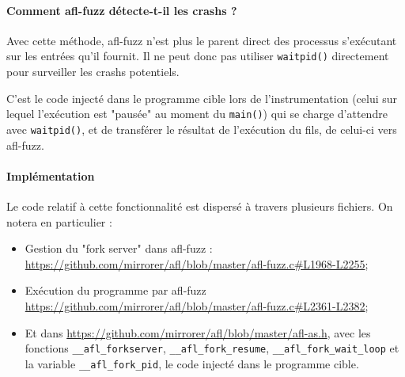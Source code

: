 
\paragraph{Comment afl-fuzz détecte-t-il les crashs ?}

Avec cette méthode, afl-fuzz n'est plus le parent direct des processus s'exécutant sur les entrées qu'il fournit.
Il ne peut donc pas utiliser \lstinline{waitpid()} directement pour surveiller les crashs potentiels.

C'est le code injecté dans le programme cible lors de l'instrumentation (celui sur lequel l'exécution est "pausée" au moment du \lstinline{main()}) qui se charge d'attendre avec \lstinline{waitpid()}, et de transférer le résultat de l'exécution du fils, de celui-ci vers afl-fuzz.

\paragraph{Implémentation}

Le code relatif à cette fonctionnalité est dispersé à travers plusieurs fichiers.
On notera en particulier :
\begin{itemize}
  \item{} Gestion du "fork server" dans afl-fuzz : \url{https://github.com/mirrorer/afl/blob/master/afl-fuzz.c#L1968-L2255};
  \item{} Exécution du programme par afl-fuzz \url{https://github.com/mirrorer/afl/blob/master/afl-fuzz.c#L2361-L2382};
  \item{} Et dans \url{https://github.com/mirrorer/afl/blob/master/afl-as.h}, avec les fonctions \lstinline{__afl_forkserver}, \lstinline{__afl_fork_resume}, \lstinline{__afl_fork_wait_loop} et la variable \lstinline{__afl_fork_pid}, le code injecté dans le programme cible.
\end{itemize}
